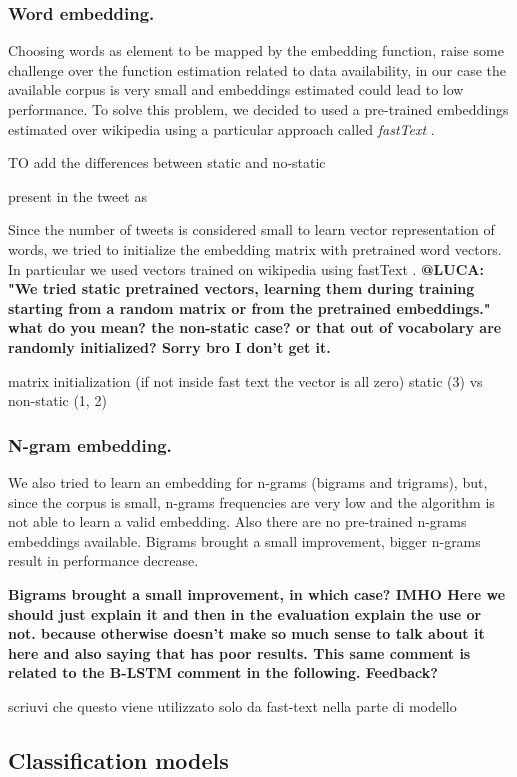 \subsubsection{Word embedding.}
Choosing words as element to be mapped by the embedding function, raise some challenge over the function estimation related to data availability, in our case the available corpus is very small and embeddings estimated could lead to low performance.
To solve this problem, we decided to used a pre-trained embeddings estimated over wikipedia using a particular approach called \emph{fastText} \cite{bojanowski2016enriching}.

TO add the differences between static and no-static

present in the tweet as 

Since the number of tweets is considered small to learn vector representation of words, we tried to initialize the embedding matrix with pretrained word vectors.
In particular we used vectors trained on wikipedia using fastText \cite{bojanowski2016enriching}.
\textbf{@LUCA: "We tried static pretrained vectors, learning them during training starting from a random matrix or from the pretrained embeddings." what do you mean? the non-static case? or that out of vocabolary are randomly initialized? Sorry bro I don't get it. }

matrix initialization (if not inside fast text the vector is all zero)
static (3) vs non-static (1, 2)


\subsubsection{N-gram embedding.}
We also tried to learn an embedding for n-grams (bigrams and trigrams), but, since the corpus is small, n-grams frequencies are very low and the algorithm is not able to learn a valid embedding.
Also there are no pre-trained n-grams embeddings available.
Bigrams brought a small improvement, bigger n-grams result in performance decrease.

\textbf{Bigrams brought a small improvement, in which case? IMHO Here we should just explain it and then in the evaluation explain the use or not. because otherwise doesn't make so much sense to talk about it here and also saying that has poor results. This same comment is related to the B-LSTM comment in the following. Feedback?}

scriuvi che questo viene utilizzato solo da fast-text nella parte di modello


\subsection{Classification models} \label{subsec:classificationModel}


